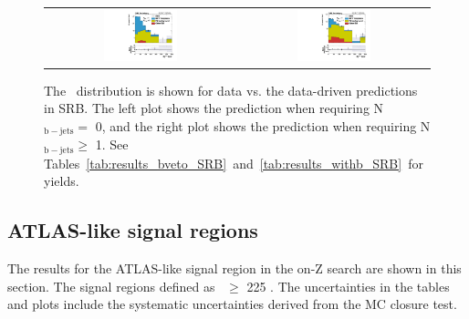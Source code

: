 \begin{figure}[!ht]
\begin{center}
\begin{tabular}{cc}
\includegraphics[width=0.4\textwidth]{results/figs/h_met_rawgt1jet_ll_signalregion_rawMET_loosephoton_bveto_SRB_fsbkg_passtrig.pdf} &
\includegraphics[width=0.4\textwidth]{results/figs/h_met_rawgt1jet_ll_signalregion_rawMET_loosephoton_withb_SRB_fsbkg_passtrig.pdf} \\
\end{tabular}
\caption{The \MET\ distribution is shown for data vs. the data-driven predictions in SRB.
The left plot shows the prediction when requiring N$\mathrm{_{b-jets}} =$ 0, and the right plot shows the prediction when requiring N$\mathrm{_{b-jets}} \geq$ 1.
See Tables~\ref{tab:results_bveto_SRB}~and~\ref{tab:results_withb_SRB}~for yields.
\label{fig:results_SRB}
}
\end{center}
\end{figure}

\clearpage


\subsection{ATLAS-like signal regions}

The results for the ATLAS-like signal region in the on-Z search are shown in this section.
The signal regions defined as \MET\ $\geq$ 225 \gev.
The uncertainties in the tables and plots include the systematic uncertainties derived from the MC closure test.

